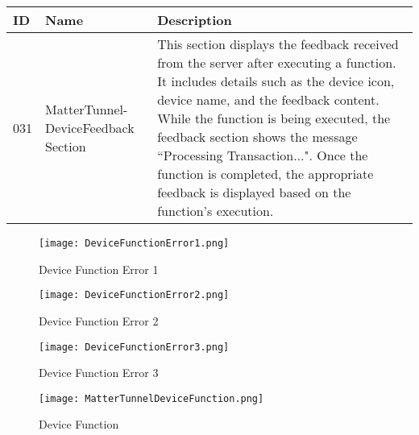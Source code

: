 \documentclass[conference]{IEEEtran}
\begin{document}
\begin{enumerate}[itemsep=2ex, parsep=1ex]
\begin{enumerate}[itemsep=2ex, parsep=1ex]
	      	      \begin{table}[h!]
	      	      	\def\arraystretch{1.24} \small
	      	      	\begin{tabular}{|p{1.2cm}|p{2.5cm}|p{4.0cm}|}
	      	      		\hline
	      	      		ID  & Name                                & Description                                                                                                                                                                                                                                                                                                                                                                                       \\
	      	      		\hline
	      	      		031 & MatterTunnel-DeviceFeedback Section & This section displays the feedback received from the server after executing a function. It includes details such as the device icon, device name, and the feedback content. While the function is being executed, the feedback section shows the message ``Processing Transaction...". Once the function is completed, the appropriate feedback is displayed based on the function’s execution. \\
	      	      		\hline
	      	      	\end{tabular}
	      	      \end{table}

                  \begin{figure}[h!]
	      	      	\centering
	      	      	\texttt{[image: DeviceFunctionError1.png]}
	      	      	\caption{Device Function Error 1}
	      	      	\label{fig:enter-label}
	      	      \end{figure}

                  \begin{figure}[h!]
	      	      	\centering
	      	      	\texttt{[image: DeviceFunctionError2.png]}
	      	      	\caption{Device Function Error 2}
	      	      	\label{fig:enter-label}
	      	      \end{figure}

                  \begin{figure}[h!]
	      	      	\centering
	      	      	\texttt{[image: DeviceFunctionError3.png]}
	      	      	\caption{Device Function Error 3}
	      	      	\label{fig:enter-label}
	      	      \end{figure}
                  
	      	      \begin{figure}[h!]
	      	      	\centering
	      	      	\texttt{[image: MatterTunnelDeviceFunction.png]}
	      	      	\caption{Device Function}
	      	      	\label{fig:DeviceFunction}
	      	      \end{figure}
	      	      	      	      

\end{enumerate}
\end{enumerate}
\end{document}
